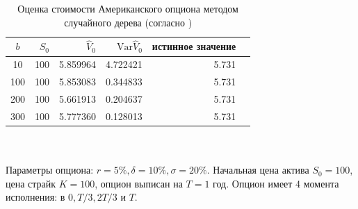 \documentclass[specialist,
               substylefile = ../spbu.rtx,
               subf,href,colorlinks=true, 10pt]{disser}
\begin{document}

\begin{table}[ht]
\center
	\caption{Оценка стоимости Американского опциона методом случайного дерева (согласно \cite{Broadie1997})}
	\begin{tabular}{c|rrrrr}
	$b$ & $S_0$ & $\hat V_0$ & $\mathrm{Var} \hat V_0$ & истинное значение \\ \hline
	10 & 100 & 5.859964 & 4.722421 & 5.731\\ 
	100 & 100 & 5.853083 & 0.344833 & 5.731\\
	200 & 100 & 5.661913 & 0.204637& 5.731\\
	300 & 100 & 5.777360 & 0.128013& 5.731\\
	\end{tabular}
	\\\hfill
	\\\hfill
	\footnotesize{Параметры опциона: $r = 5\%, \delta = 10\%, \sigma = 20\%$. Начальная цена актива $S_0 = 100$, цена страйк $K = 100$, опцион выписан на $T=1$ год. Опцион имеет 4 момента исполнения: в $0, T/3, 2T/3$ и $T$.}
	\label{tbl:tree}
\end{table}
\end{document}
